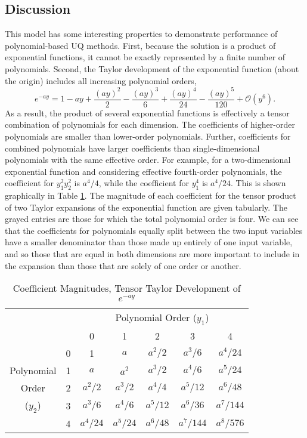 \subsection{Discussion}
This model has some interesting properties to demonstrate performance of polynomial-based UQ methods.  First,
because the solution is a product of exponential functions, it cannot be exactly represented by a finite
number of polynomials.  Second, the Taylor development of the exponential function (about the origin) 
includes all increasing polynomial orders,
\begin{equation}
e^{-ay} = 1 - ay + \frac{(ay)^2}{2} - \frac{(ay)^3}{6} + \frac{(ay)^4}{24} - \frac{(ay)^5}{120} + \mathcal{O}(y^6).
\end{equation}
As a result, the product of several exponential functions is effectively a tensor combination of
polynomials for each dimension.  The coefficients of higher-order polynomials are smaller than lower-order
polynomials.  Further, coefficients for combined polynomials 
have larger coefficients than single-dimensional
polynomials with the same effective order.  For example, for a two-dimensional exponential function and
considering effective fourth-order polynomials, the coefficient for $y_1^2y_2^2$ is $a^4/4$, while the
coefficient for $y_1^4$ is $a^4/24$.  This is shown graphically in Table \ref{tab:atten coeffs}.  The
magnitude of each coefficient for the tensor product of two Taylor expansions of the exponential function are
given tabularly.  The grayed entries are those for which the total polynomial order is four.  We can see
that the coefficients for polynomials equally split between the two input variables have a smaller denominator than
those made up entirely of one input variable, and so those that are equal in both dimensions are more
important to include in the expansion than those that are solely of one order or another.
\begin{table}
  \centering
  \begin{tabular}{|c c|c c c c c|}
    \cline{3-7}\multicolumn{2}{c|}{ } & \multicolumn{5}{c|}{Polynomial Order ($y_1$)} \\
               \multicolumn{2}{c|}{ } & 0 & 1 & 2 & 3 & 4 \\
    \hline & 0 & 1        & $a$      & $a^2/2$  & $a^3/6$   & \cellcolor{Gray6}$a^4/24$  \\
Polynomial & 1 & $a$      & $a^2   $ & $a^3/2 $ & \cellcolor{Gray6}$a^4/6  $ & $a^5/24 $ \\
Order      & 2 & $a^2/2$  & $a^3/2 $ & \cellcolor{Gray6}$a^4/4 $ & $a^5/12 $ & $a^6/48 $ \\
($y_2$)    & 3 & $a^3/ 6$ & \cellcolor{Gray6}$a^4/ 6$ & $a^5/12$ & $a^6/ 36$ & $a^7/144$ \\
           & 4 & \cellcolor{Gray6}$a^4/24$ & $a^5/24$ & $a^6/48$ & $a^7/144$ & $a^8/576$ \\
    \hline
  \end{tabular}
  \caption{Coefficient Magnitudes, Tensor Taylor Development of $e^{-ay}$}
  \label{tab:atten coeffs}
\end{table}
